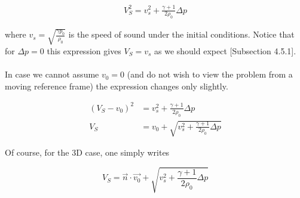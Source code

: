 \begin{equation}
\label{eq:Riemann-solution}
\begin{split}
V_S^2 = v_s^2 + \frac{\gamma + 1}{2 \rho_0} \Delta p
\end{split}
\end{equation}

where $v_s = \sqrt{\frac{\gamma p_0}{\rho_0}}$ is the speed of sound under the initial conditions. Notice that for $\Delta p = 0$ this expression gives $V_S = v_s$ as we should expect \cite{notes-principles-MHD}[Subsection 4.5.1].\\
\\
In case we cannot assume $v_0 = 0$ (and do not wish to view the problem from a moving reference frame) the expression changes only slightly.

\begin{equation}
\label{eq:Riemann-solution2}
\begin{split}
(V_S - v_0)^2 &= v_s^2 + \frac{\gamma + 1}{2 \rho_0} \Delta p \\
V_S &= v_0 + \sqrt{v_s^2 + \frac{\gamma + 1}{2 \rho_0} \Delta p}
\end{split}
\end{equation}

Of course, for the 3D case, one simply writes

\begin{equation}
\label{eq:Riemann-solution-3D}
V_S = \vec{n} \cdot \vec{v_0} + \sqrt{v_s^2 + \frac{\gamma + 1}{2 \rho_0} \Delta p}
\end{equation}